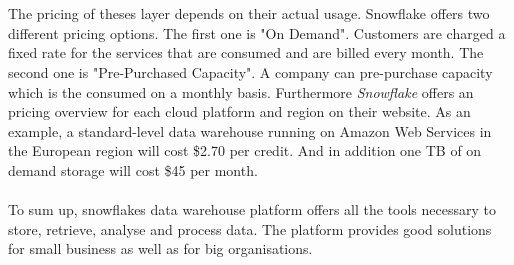 \documentclass[../paper.tex]{subfiles}
\begin{document}
\\ \\
The pricing of theses layer depends on their actual usage. Snowflake offers two different pricing options. The first one is "On Demand". Customers are charged a fixed rate for the services that are consumed and are billed every month. The second one is "Pre-Purchased Capacity". A company can pre-purchase capacity which is the consumed on a monthly basis. Furthermore \textit{Snowflake} offers an pricing overview for each cloud platform and region on their website. As an example, a standard-level data warehouse running on Amazon Web Services in the European region will cost \$2.70 per credit. And in addition one TB of on demand storage will cost \$45 per month. \\ \\
To sum up, snowflakes data warehouse platform offers all the tools necessary to store, retrieve, analyse and process data. The platform provides good solutions for small business as well as for big organisations.
\end{document}
